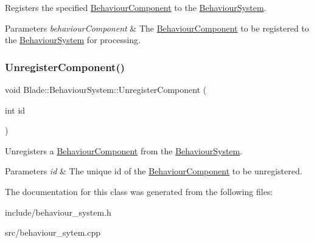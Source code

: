 Registers the specified \hyperlink{class_blade_1_1_behaviour_component}{Behaviour\+Component} to the \hyperlink{class_blade_1_1_behaviour_system}{Behaviour\+System}. 


\begin{DoxyParams}{Parameters}
{\em behaviour\+Component} & The \hyperlink{class_blade_1_1_behaviour_component}{Behaviour\+Component} to be registered to the \hyperlink{class_blade_1_1_behaviour_system}{Behaviour\+System} for processing. \\
\hline
\end{DoxyParams}
\mbox{\label{class_blade_1_1_behaviour_system_a42ca453f54a399c8fb2a1e0010b3d318}} 
\subsubsection{\texorpdfstring{Unregister\+Component()}{UnregisterComponent()}}
{\footnotesize\ttfamily void Blade\+::\+Behaviour\+System\+::\+Unregister\+Component (\begin{DoxyParamCaption}\item[{int}]{id }\end{DoxyParamCaption})\hspace{0.3cm}{\ttfamily [noexcept]}}



Unregisters a \hyperlink{class_blade_1_1_behaviour_component}{Behaviour\+Component} from the \hyperlink{class_blade_1_1_behaviour_system}{Behaviour\+System}. 


\begin{DoxyParams}{Parameters}
{\em id} & The unique id of the \hyperlink{class_blade_1_1_behaviour_component}{Behaviour\+Component} to be unregistered. \\
\hline
\end{DoxyParams}


The documentation for this class was generated from the following files\+:\begin{DoxyCompactItemize}
\item 
include/behaviour\+\_\+system.\+h\item 
src/behaviour\+\_\+sytem.\+cpp\end{DoxyCompactItemize}
